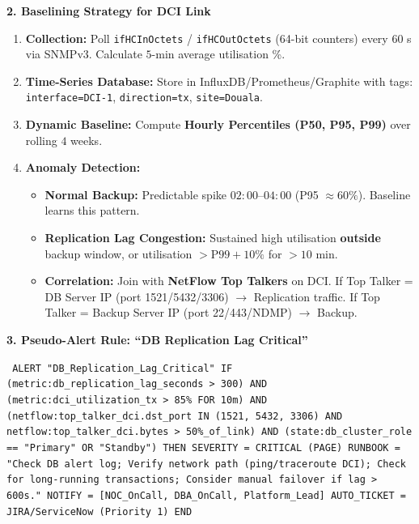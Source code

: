 \documentclass[11pt]{article}
\begin{document}
\begin{exoresolu}
\noindent\textbf{2. Baselining Strategy for DCI Link}
\begin{enumerate}
    \item \textbf{Collection:} Poll \texttt{ifHCInOctets} / \texttt{ifHCOutOctets} (64-bit counters) every $60$ s via SNMPv3. Calculate $5$-min average utilisation \%.
    \item \textbf{Time-Series Database:} Store in InfluxDB/Prometheus/Graphite with tags: \texttt{interface=DCI-1}, \texttt{direction=tx}, \texttt{site=Douala}.
    \item \textbf{Dynamic Baseline:} Compute \textbf{Hourly Percentiles (P50, P95, P99)} over rolling $4$ weeks.
    \item \textbf{Anomaly Detection:} 
    \begin{itemize}
        \item \textbf{Normal Backup:} Predictable spike $02{:}00$--$04{:}00$ (P95 $\approx 60\%$). Baseline learns this pattern.
        \item \textbf{Replication Lag Congestion:} Sustained high utilisation \textbf{outside} backup window, or utilisation $> \text{P99} + 10\%$ for $> 10$ min.
        \item \textbf{Correlation:} Join with \textbf{NetFlow Top Talkers} on DCI. If Top Talker = DB Server IP (port 1521/5432/3306) $\rightarrow$ Replication traffic. If Top Talker = Backup Server IP (port 22/443/NDMP) $\rightarrow$ Backup.
    \end{itemize}
\end{enumerate}

\noindent\textbf{3. Pseudo-Alert Rule: ``DB Replication Lag Critical''}
\begin{flushleft}
\texttt{
ALERT "DB\_Replication\_Lag\_Critical"\newline
IF  (metric:db\_replication\_lag\_seconds > 300) \newline
    AND (metric:dci\_utilization\_tx > 85\% FOR 10m)\newline
    AND (netflow:top\_talker\_dci.dst\_port IN (1521, 5432, 3306) \newline
         AND netflow:top\_talker\_dci.bytes > 50\%\_of\_link)\newline
    AND (state:db\_cluster\_role == "Primary" OR "Standby")\newline
THEN\newline
    SEVERITY = CRITICAL (PAGE)\newline
    RUNBOOK = "Check DB alert log; Verify network path (ping/traceroute DCI); \newline
               Check for long-running transactions; Consider manual failover if lag > 600s."\newline
    NOTIFY = [NOC\_OnCall, DBA\_OnCall, Platform\_Lead]\newline
    AUTO\_TICKET = JIRA/ServiceNow (Priority 1)\newline
END
}
\end{flushleft}


\end{exoresolu}
\end{document}
